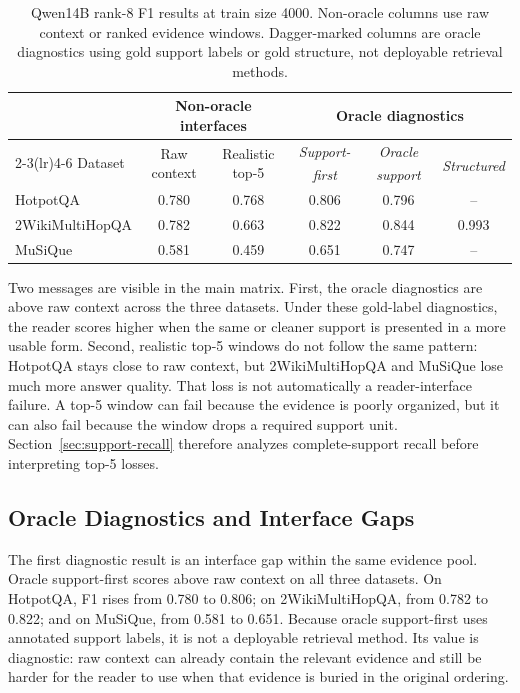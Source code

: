 \documentclass[a4paper,fleqn]{cas-sc}
\newcommand{\diagiface}[1]{\emph{#1}\textsuperscript{\dag}}
\begin{document}
\begin{table}[t]
\centering
\caption{Qwen14B rank-8 F1 results at train size 4000. Non-oracle columns use
raw context or ranked evidence windows. Dagger-marked columns are oracle
diagnostics using gold support labels or gold structure, not deployable
retrieval methods.}
\label{tab:qwen14b-main-scaling}
\begin{tabular}{lccccc}
\toprule
& \multicolumn{2}{c}{Non-oracle interfaces} & \multicolumn{3}{c}{Oracle diagnostics} \\
\cmidrule(lr){2-3}\cmidrule(lr){4-6}
Dataset & Raw context & Realistic top-5 & \diagiface{Support-first} & \diagiface{Oracle support} & \diagiface{Structured} \\
\midrule
HotpotQA & 0.780 & 0.768 & 0.806 & 0.796 & -- \\
2WikiMultiHopQA & 0.782 & 0.663 & 0.822 & 0.844 & 0.993 \\
MuSiQue & 0.581 & 0.459 & 0.651 & 0.747 & -- \\
\bottomrule
\end{tabular}
\end{table}

Two messages are visible in the main matrix. First, the oracle diagnostics are
above raw context across the three datasets. Under these gold-label
diagnostics, the reader scores higher when the same or cleaner support is
presented in a more usable form. Second, realistic top-5 windows do not follow
the same pattern: HotpotQA stays close to raw context, but 2WikiMultiHopQA and
MuSiQue lose much more answer quality. That loss is not automatically a
reader-interface failure. A top-5 window can fail because the evidence is
poorly organized, but it can also fail because the window drops a required
support unit. Section~\ref{sec:support-recall} therefore analyzes
complete-support recall before interpreting top-5 losses.

\subsection{Oracle Diagnostics and Interface Gaps}

The first diagnostic result is an interface gap within the same evidence pool.
Oracle support-first scores above raw context on all three datasets. On
HotpotQA, F1 rises from 0.780 to 0.806; on 2WikiMultiHopQA, from 0.782 to
0.822; and on MuSiQue, from 0.581 to 0.651. Because oracle support-first uses
annotated support labels, it is not a deployable retrieval method. Its value is
diagnostic: raw context can already contain the relevant evidence and still be
harder for the reader to use when that evidence is buried in the original
ordering.
\end{document}
